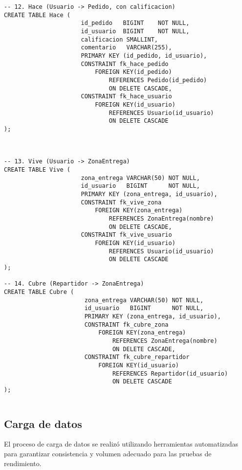 \documentclass[12pt,a4paper]{article}
\begin{document}
\begin{lstlisting}
-- 12. Hace (Usuario -> Pedido, con calificacion)
CREATE TABLE Hace (
                      id_pedido   BIGINT    NOT NULL,
                      id_usuario  BIGINT    NOT NULL,
                      calificacion SMALLINT,
                      comentario   VARCHAR(255),
                      PRIMARY KEY (id_pedido, id_usuario),
                      CONSTRAINT fk_hace_pedido
                          FOREIGN KEY(id_pedido)
                              REFERENCES Pedido(id_pedido)
                              ON DELETE CASCADE,
                      CONSTRAINT fk_hace_usuario
                          FOREIGN KEY(id_usuario)
                              REFERENCES Usuario(id_usuario)
                              ON DELETE CASCADE
);



-- 13. Vive (Usuario -> ZonaEntrega)
CREATE TABLE Vive (
                      zona_entrega VARCHAR(50) NOT NULL,
                      id_usuario   BIGINT      NOT NULL,
                      PRIMARY KEY (zona_entrega, id_usuario),
                      CONSTRAINT fk_vive_zona
                          FOREIGN KEY(zona_entrega)
                              REFERENCES ZonaEntrega(nombre)
                              ON DELETE CASCADE,
                      CONSTRAINT fk_vive_usuario
                          FOREIGN KEY(id_usuario)
                              REFERENCES Usuario(id_usuario)
                              ON DELETE CASCADE
);

-- 14. Cubre (Repartidor -> ZonaEntrega)
CREATE TABLE Cubre (
                       zona_entrega VARCHAR(50) NOT NULL,
                       id_usuario   BIGINT      NOT NULL,
                       PRIMARY KEY (zona_entrega, id_usuario),
                       CONSTRAINT fk_cubre_zona
                           FOREIGN KEY(zona_entrega)
                               REFERENCES ZonaEntrega(nombre)
                               ON DELETE CASCADE,
                       CONSTRAINT fk_cubre_repartidor
                           FOREIGN KEY(id_usuario)
                               REFERENCES Repartidor(id_usuario)
                               ON DELETE CASCADE
);


\end{lstlisting}

\subsection{Carga de datos}
El proceso de carga de datos se realizó utilizando herramientas automatizadas para garantizar consistencia y volumen adecuado para las pruebas de rendimiento.
\end{document}
